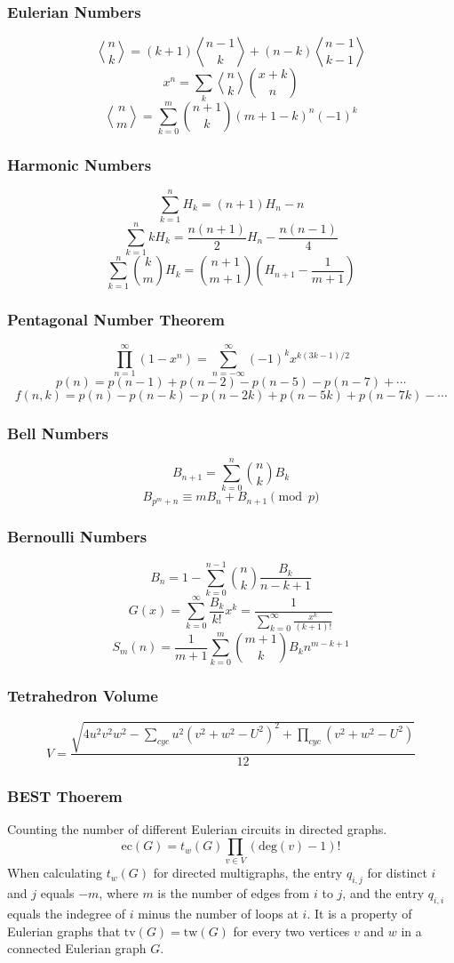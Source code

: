 \begin{small}
\subsubsection{Eulerian Numbers}
\[ {n \bangle k} = (k+1){n-1 \bangle k} + (n-k){n-1 \bangle k-1} \]
\[ x^n = \sum_k{ {n \bangle k}{x+k \choose n} } \]
\[ {n \bangle m} = \sum_{k=0}^m{n+1 \choose k}(m+1-k)^n(-1)^k \]
\subsubsection{Harmonic Numbers}
\[ \sum_{k=1}^nH_k = (n+1)H_n-n \]
\[ \sum_{k=1}^nkH_k = \frac{n(n+1)}{2}H_n - \frac{n(n-1)}{4} \]
\[ \sum_{k=1}^n{k \choose m}H_k = {n+1 \choose m+1}(H_{n+1} - \frac{1}{m+1}) \]
\subsubsection{Pentagonal Number Theorem}
\[ \prod_{n=1}^{\infty}(1-x^n) = \sum_{n=-\infty}^{\infty}{(-1)^kx^{k(3k-1)/2}} \]
\[ p(n) = p(n-1)+p(n-2)-p(n-5)-p(n-7)+\cdots \]
\[ f(n, k) = p(n)-p(n-k)-p(n-2k)+p(n-5k)+p(n-7k)-\cdots \]
\subsubsection{Bell Numbers}
\[ B_{n+1} = \sum_{k=0}^n{n \choose k}B_k \]
\[ B_{p^m+n} \equiv mB_n+B_{n+1} \pmod{p} \]
\subsubsection{Bernoulli Numbers}
\[ B_n = 1 - \sum_{k=0}^{n-1}{n \choose k}\frac{B_k}{n-k+1} \]
\[ G(x) = \sum_{k=0}^{\infty}\frac{B_k}{k!}x^k
= \frac{1}{\sum_{k=0}^{\infty}\frac{x^k}{(k+1)!}} \]
\[ S_m(n) = \frac{1}{m+1}\sum_{k=0}^m{m+1 \choose k}B_kn^{m-k+1} \]
\subsubsection{Tetrahedron Volume}
\[ V = \frac{\sqrt{ 4u^2v^2w^2 - \sum_{cyc}{u^2(v^2+w^2-U^2)^2} + \prod_{cyc}{(v^2+w^2-U^2)} }}{12} \]
\subsubsection{BEST Thoerem}
Counting the number of different Eulerian circuits in directed graphs.
\[ \mathrm{ec}(G) = t_w(G)\prod_{v \in{V}}(\mathrm{deg}(v) - 1)! \]
When calculating $t_w(G)$ for directed multigraphs, the entry $q_{i,j}$ for distinct $i$ and $j$ equals $−m$, where $m$ is the number of edges from $i$ to $j$, and the entry $q_{i,i}$ equals the indegree of $i$ minus the number of loops at $i$.
It is a property of Eulerian graphs that $ \mathrm{tv}(G) = \mathrm{tw}(G)$ for every two vertices $v$ and $w$ in a connected Eulerian graph $G$.


\end{small}
